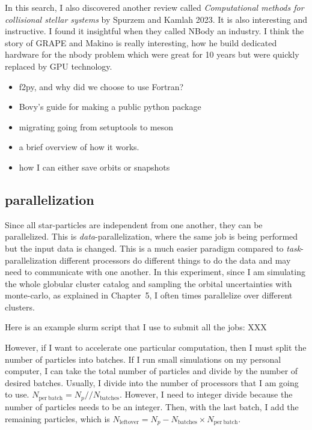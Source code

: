     In this search, I also discovered another review called \textit{Computational methods for collisional stellar systems} by Spurzem and Kamlah 2023. It is also interesting and instructive. I found it insightful when they called NBody an industry. I think the story of GRAPE and Makino is really interesting, how he build dedicated hardware for the nbody problem which were great for 10 years but were quickly replaced by GPU technology. 
    \begin{itemize}
        \item f2py, and why did we choose to use Fortran? 
        \item Bovy's guide for making a public python package
        \item migrating going from setuptools to meson
        \item a brief overview of how it works. 
        \item how I can either save orbits or snapshots
    \end{itemize}


        \subsection{parallelization}
            Since all star-particles are independent from one another, they can be parallelized. This is \textit{data}-parallelization, where the same job is being performed but the input data is changed. This is a much easier paradigm compared to \textit{task}-parallelization different processors do different things to do the data and may need to communicate with one another. In this experiment, since I am simulating the whole globular cluster catalog and sampling the orbital uncertainties with monte-carlo, as explained in Chapter~5, I often times parallelize over different clusters. 
            
            
            Here is an example slurm script that I use to submit all the jobs: XXX
            
            However, if I want to accelerate one particular computation, then I must split the number of particles into batches. If I run small simulations on my personal computer, I can take the total number of particles and divide by the number of desired batches. Usually, I divide into the number of processors that I am going to use. $N_\mathrm{per~batch}=N_p//N_\mathrm{batches}$. However, I need to integer divide because the number of particles needs to be an integer. Then, with the last batch, I add the remaining particles, which is $N_\mathrm{left over} = N_p - N_\mathrm{batches} \times N_\mathrm{per~batch}$. 



